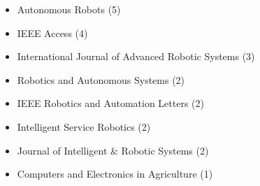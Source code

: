 \begin{itemize}
	\item Autonomous Robots (5)
	\item IEEE Access (4)
	\item International Journal of Advanced Robotic Systems (3)
	\item Robotics and Autonomous Systems (2)
	\item IEEE Robotics and Automation Letters (2)
	\item Intelligent Service Robotics (2)
	\item Journal of Intelligent \& Robotic Systems (2)
	\item Computers and Electronics in Agriculture (1)
\end{itemize}